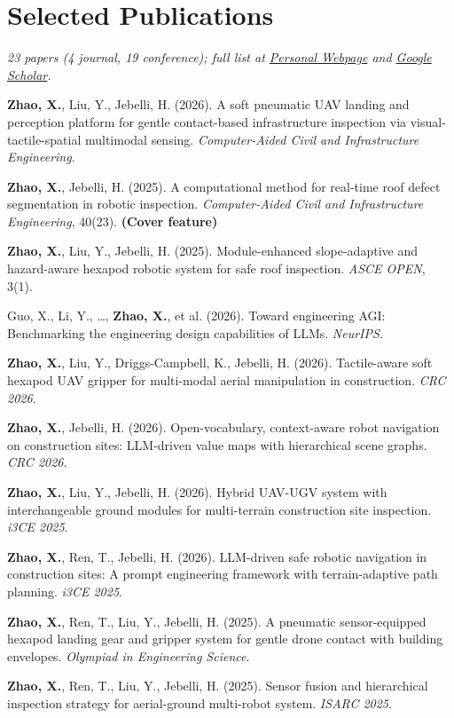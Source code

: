 \documentclass[10pt,a4paper]{article}
\newcommand{\me}{\textbf{Zhao, X.}}
\begin{document}
\section{Selected Publications}
{\footnotesize
\textit{23 papers (4 journal, 19 conference); full list at \href{https://xiayu-zhao.github.io/publications/}{Personal Webpage} and \href{https://scholar.google.com/citations?user=a1trBDoAAAAJ&hl=en}{Google Scholar}.}
\begin{enumerate}[leftmargin=1.5em, label={[\arabic*]}]
\item \me, Liu, Y., Jebelli, H. (2026). A soft pneumatic UAV landing and perception platform for gentle contact-based infrastructure inspection via visual-tactile-spatial multimodal sensing. \textit{Computer-Aided Civil and Infrastructure Engineering}.
\item \me, Jebelli, H. (2025). A computational method for real-time roof defect segmentation in robotic inspection. \textit{Computer-Aided Civil and Infrastructure Engineering}, 40(23). \textbf{(Cover feature)}
\item \me, Liu, Y., Jebelli, H. (2025). Module-enhanced slope-adaptive and hazard-aware hexapod robotic system for safe roof inspection. \textit{ASCE OPEN}, 3(1).
\item Guo, X., Li, Y., \ldots, \me, et al. (2026). Toward engineering AGI: Benchmarking the engineering design capabilities of LLMs. \textit{NeurIPS}.
\item \me, Liu, Y., Driggs-Campbell, K., Jebelli, H. (2026). Tactile-aware soft hexapod UAV gripper for multi-modal aerial manipulation in construction. \textit{CRC 2026}.
\item \me, Jebelli, H. (2026). Open-vocabulary, context-aware robot navigation on construction sites: LLM-driven value maps with hierarchical scene graphs. \textit{CRC 2026}.
\item \me, Liu, Y., Jebelli, H. (2026). Hybrid UAV-UGV system with interchangeable ground modules for multi-terrain construction site inspection. \textit{i3CE 2025}.
\item \me, Ren, T., Jebelli, H. (2026). LLM-driven safe robotic navigation in construction sites: A prompt engineering framework with terrain-adaptive path planning. \textit{i3CE 2025}.
\item \me, Ren, T., Liu, Y., Jebelli, H. (2025). A pneumatic sensor-equipped hexapod landing gear and gripper system for gentle drone contact with building envelopes. \textit{Olympiad in Engineering Science}.
\item \me, Ren, T., Liu, Y., Jebelli, H. (2025). Sensor fusion and hierarchical inspection strategy for aerial-ground multi-robot system. \textit{ISARC 2025}.

\end{enumerate}}
\end{document}
